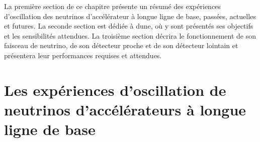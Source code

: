   La première section de ce chapitre présente un résumé des expériences d'oscillation des neutrinos d'accélérateur à longue ligne de base, passées, actuelles et futures. La seconde section est dédiée à \gls{dune}, où y sont présentés ses objectifs et les sensibilités attendues. La troisième section décrira le fonctionnement de son faisceau de neutrino, de son détecteur proche et de son détecteur lointain et présentera leur performances requises et attendues.

  \section[Les expériences de faisceau longue ligne de base]{Les expériences d'oscillation de neutrinos d'accélérateurs à longue ligne de base}

%    
%    
